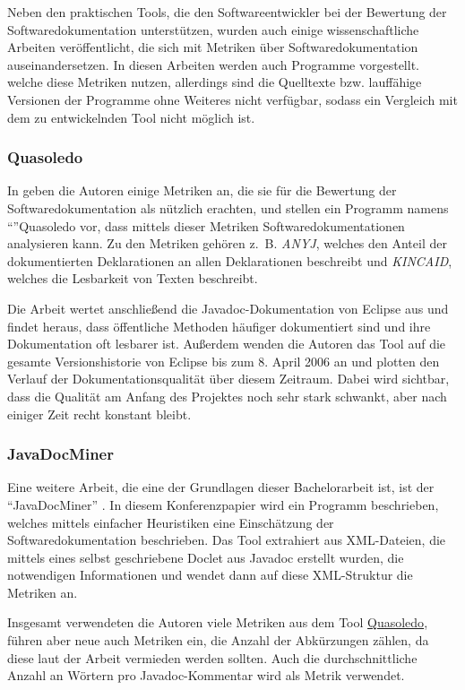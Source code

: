 Neben den praktischen Tools, die den Softwareentwickler bei der Bewertung der Softwaredokumentation unterstützen, wurden auch einige wissenschaftliche Arbeiten veröffentlicht, die sich mit Metriken über Softwaredokumentation auseinandersetzen. In diesen Arbeiten werden auch Programme vorgestellt. welche diese Metriken nutzen, allerdings sind die Quelltexte bzw.  lauffähige Versionen der Programme ohne Weiteres nicht verfügbar, sodass ein Vergleich mit dem zu entwickelnden Tool nicht möglich ist. 


\subsubsection{Quasoledo}\label{chapter:Quasoledo}
In \cite[S. 4-10]{HowDocumentationEvolvesoverTime} geben die Autoren einige Metriken an, die sie für die Bewertung der Softwaredokumentation als nützlich erachten, und stellen ein Programm namens \enquote{}{Quasoledo} vor, dass mittels dieser Metriken Softwaredokumentationen analysieren kann. Zu den Metriken gehören z.~B.  \textit{ANYJ},  welches den Anteil der dokumentierten Deklarationen an allen Deklarationen beschreibt und \textit{KINCAID}, welches die Lesbarkeit von Texten beschreibt.

Die Arbeit wertet anschließend die Javadoc-Dokumentation von Eclipse aus und findet heraus, dass öffentliche Methoden häufiger dokumentiert sind und ihre Dokumentation oft lesbarer ist. Außerdem wenden die Autoren das Tool auf die gesamte Versionshistorie von Eclipse bis zum 8. April 2006 an und plotten den Verlauf der Dokumentationsqualität über diesem Zeitraum. Dabei wird sichtbar, dass die Qualität am Anfang des Projektes noch sehr stark schwankt, aber nach einiger Zeit recht konstant bleibt. 
\subsubsection{JavaDocMiner}
Eine weitere Arbeit, die eine der Grundlagen dieser Bachelorarbeit ist, ist der \enquote{JavaDocMiner} \cite[S. 68-79]{AutomaticQualityAssessmentofSourceCodeComments:TheJavadocMiner}. In diesem Konferenzpapier wird ein Programm beschrieben, welches mittels einfacher Heuristiken eine Einschätzung der Softwaredokumentation beschrieben. Das Tool extrahiert aus XML-Dateien, die mittels eines selbst geschriebene Doclet aus Javadoc erstellt wurden, die notwendigen Informationen und wendet dann auf diese XML-Struktur die Metriken an. 

Insgesamt verwendeten die Autoren viele Metriken aus dem Tool \hyperref[chapter:Quasoledo]{Quasoledo}, führen aber neue auch Metriken ein, die Anzahl der Abkürzungen zählen, da diese laut der Arbeit vermieden werden sollten. Auch die durchschnittliche Anzahl an Wörtern pro Javadoc-Kommentar wird als Metrik verwendet. 

